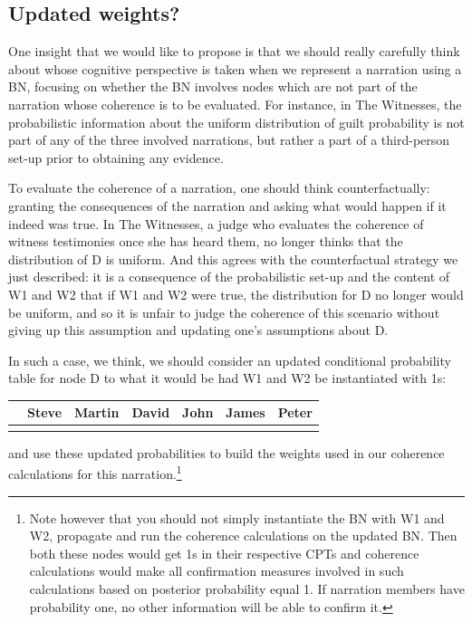 \documentclass[10pt,]{scrartcl}
\begin{document}

\subsection{Updated weights?}


One insight that we would like to propose is that we should really carefully think about whose cognitive perspective is taken when we represent a narration using a BN, focusing on whether the BN involves nodes which are not part of the narration whose coherence is to be
evaluated. For instance, in \textsf{The Witnesses}, the probabilistic information about the
uniform distribution of guilt probability is not part of any of the three involved narrations, but rather a part of a third-person set-up prior to obtaining any evidence.

To evaluate the coherence of a narration,  one should think counterfactually: granting the consequences of the
narration and asking what would happen if it indeed was true. 
In \textsf{The Witnesses}, a judge who evaluates the coherence of witness testimonies once she has heard them, no longer thinks that the distribution of \textsf{D} is uniform. And this agrees with the counterfactual strategy we just
described: it is a consequence of the probabilistic set-up and the content of \textsf{W1} and \textsf{W2} that if \textsf{W1} and
\textsf{W2} were true, the distribution for \textsf{D} no longer would
be uniform, and so it is unfair to judge the coherence of this scenario
without giving up this assumption and updating one's assumptions about
\textsf{D}.

In such a case, we think, we should consider an updated conditional probability table for node \textsf{D} to what it would be had \textsf{W1} and \textsf{W2} be instantiated with 1s:

\begin{table}[H]
\centering
\begin{tabular}{lrrrrrr}
\toprule
  & Steve & Martin & David & John & James & Peter\\
\midrule
\cellcolor{gray!6}{Pr} & \cellcolor{gray!6}{0.981} & \cellcolor{gray!6}{0.004} & \cellcolor{gray!6}{0.004} & \cellcolor{gray!6}{0.004} & \cellcolor{gray!6}{0.004} & \cellcolor{gray!6}{0.004}\\
\bottomrule
\end{tabular}
\end{table}

\noindent and use these updated probabilities to build the weights used in our coherence calculations for this narration.\footnote{Note  however that  you should not simply instantiate the BN with \textsf{W1} and \textsf{W2}, propagate and run the coherence calculations on the updated BN. Then both these nodes would get 1s in their respective CPTs and coherence calculations would make   all  confirmation measures involved in such calculations  based on posterior probability equal 1. If narration members have probability one, no other information will be able to confirm it.}
\end{document}
